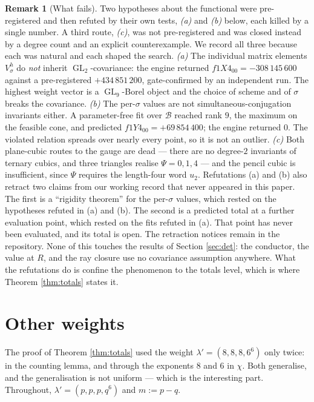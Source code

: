 \documentclass[11pt,reqno]{amsart}
\theoremstyle{plain}
\theoremstyle{definition}
\newtheorem{remark}[theorem]{Remark}
\DeclareMathOperator{\GL}{GL}
\begin{document}
\begin{remark}[What fails]\label{rem:fails}
Two hypotheses about the functional were pre-registered and then refuted by
their own tests, \emph{(a)} and \emph{(b)} below, each killed by a single
number.  A third route, \emph{(c)}, was not pre-registered and was closed
instead by a degree count and an explicit counterexample.  We record all three
because each was natural and each shaped the search.
\emph{(a)} The individual matrix elements $V^{h}_{\sigma}$ do \emph{not}
inherit $\GL_2$-covariance: the engine returned $f1X4_{00}=-308\,145\,600$
against a pre-registered $+434\,851\,200$, gate-confirmed by an independent
run.  The highest weight vector is a $\GL_9$-Borel object and the choice of
scheme and of $\sigma$ breaks the covariance.
\emph{(b)} The per-$\sigma$ values are not simultaneous-conjugation invariants
either.  A parameter-free fit over $\mathcal B$ reached rank $9$, the maximum
on the feasible cone, and predicted $f1Y4_{00}=+69\,854\,400$; the engine
returned $0$.  The violated relation spreads over nearly every point, so it is
not an outlier.
\emph{(c)} Both plane-cubic routes to the gauge are dead --- there are no
degree-$2$ invariants of ternary cubics, and three triangles realise
$\Psi=0,1,4$ --- and the pencil cubic is insufficient, since $\Psi$ requires
the length-four word $u_2$.
Refutations (a) and (b) also retract two claims from our working record that
never appeared in this paper.  The first is a ``rigidity theorem'' for the
per-$\sigma$ values, which rested on the hypotheses refuted in (a) and (b).  The
second is a predicted total at a further evaluation point, which rested on the
fits refuted in (a).  That point has never been evaluated, and its total is
open.  The retraction notices remain in the repository.
None of this touches the results of Section \ref{sec:det}: the conductor, the
value at $R$, and the ray closure use no covariance assumption anywhere.  What
the refutations do is confine the phenomenon to the totals level, which is
where Theorem \ref{thm:totals} states it.
\end{remark}

\section{Other weights}\label{sec:pq}

The proof of Theorem \ref{thm:totals} used the weight $\lambda'=(8,8,8,6^{6})$
only twice: in the counting lemma, and through the exponents $8$ and $6$ in
$\chi$.  Both generalise, and the generalisation is not uniform --- which is the
interesting part.  Throughout, $\lambda'=(p,p,p,q^{6})$ and $m:=p-q$.
\end{document}

